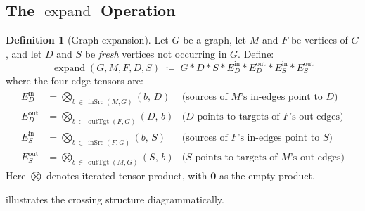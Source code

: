 \documentclass[11pt, a4paper]{article}
\theoremstyle{definition}
\newtheorem{definition}{Definition}[section]
\theoremstyle{plain}
\theoremstyle{remark}
\newcommand{\inSrc}{\operatorname{inSrc}}
\newcommand{\outTgt}{\operatorname{outTgt}}
\newcommand{\expand}{\operatorname{expand}}
\newcommand{\GNil}{\mathbf{0}}
\newcommand{\tensor}{\mathbin{*}}
\begin{document}
\subsection{The \texorpdfstring{$\expand$}{expand} Operation}

\begin{definition}[Graph expansion]
\label{def:expand}
Let $G$ be a graph, let $M$ and $F$ be vertices of $G$, and let $D$ and $S$ be
\emph{fresh} vertices not occurring in $G$.  Define:
\[
  \expand(G, M, F, D, S) \;\coloneqq\;
    G \tensor D \tensor S
    \tensor E_D^{\mathrm{in}}
    \tensor E_D^{\mathrm{out}}
    \tensor E_S^{\mathrm{in}}
    \tensor E_S^{\mathrm{out}}
\]
where the four edge tensors are:
\begin{align*}
  E_D^{\mathrm{in}}  &= \bigotimes_{b\,\in\,\inSrc(M,G)}  (b,\, D)
  & \text{(sources of } M\text{'s in-edges point to }D\text{)}\\
  E_D^{\mathrm{out}} &= \bigotimes_{b\,\in\,\outTgt(F,G)} (D,\, b)
  & \text{(}D\text{ points to targets of }F\text{'s out-edges)}\\
  E_S^{\mathrm{in}}  &= \bigotimes_{b\,\in\,\inSrc(F,G)}  (b,\, S)
  & \text{(sources of }F\text{'s in-edges point to }S\text{)}\\
  E_S^{\mathrm{out}} &= \bigotimes_{b\,\in\,\outTgt(M,G)} (S,\, b)
  & \text{(}S\text{ points to targets of }M\text{'s out-edges)}
\end{align*}
Here $\bigotimes$ denotes iterated tensor product, with $\GNil$ as the empty
product.
\end{definition}

 illustrates the crossing structure diagrammatically.
\end{document}
